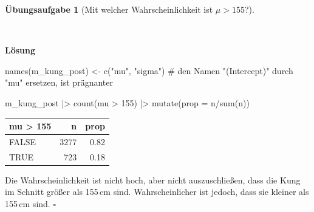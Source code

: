 \documentclass[
  ngerman,
  letterpaper,
  twoside,
  open=any]{scrbook}
\newenvironment{Shaded}{\begin{snugshade}}{\end{snugshade}}
\newcommand{\AttributeTok}[1]{\textcolor[rgb]{0.40,0.45,0.13}{#1}}
\newcommand{\CommentTok}[1]{\textcolor[rgb]{0.37,0.37,0.37}{#1}}
\newcommand{\DecValTok}[1]{\textcolor[rgb]{0.68,0.00,0.00}{#1}}
\newcommand{\FunctionTok}[1]{\textcolor[rgb]{0.28,0.35,0.67}{#1}}
\newcommand{\NormalTok}[1]{\textcolor[rgb]{0.00,0.23,0.31}{#1}}
\newcommand{\OtherTok}[1]{\textcolor[rgb]{0.00,0.23,0.31}{#1}}
\newcommand{\SpecialCharTok}[1]{\textcolor[rgb]{0.37,0.37,0.37}{#1}}
\newcommand{\StringTok}[1]{\textcolor[rgb]{0.13,0.47,0.30}{#1}}
\newcounter{none} %
\theoremstyle{definition}
\theoremstyle{plain}
\theoremstyle{definition}
\newtheorem{exercise}{Übungsaufgabe}[chapter]
\theoremstyle{definition}
\theoremstyle{definition}
\theoremstyle{definition}
\newtheorem{exercise}{Übungsaufgabe}[chapter]
\theoremstyle{remark}
\begin{document}
\begin{exercise}[Mit welcher Wahrscheinlichkeit ist
\(\mu>155\)?]\protect\hypertarget{exr-kung1}{}\label{exr-kung1}

~

\begin{tcolorbox}[enhanced jigsaw, arc=.35mm, bottomrule=.15mm, breakable, colback=white, colframe=quarto-callout-tip-color-frame, left=2mm, leftrule=.75mm, opacityback=0, rightrule=.15mm, toprule=.15mm]

\vspace{-3mm}\textbf{Lösung}\vspace{3mm}

\begin{Shaded}
\begin{Highlighting}[]

\FunctionTok{names}\NormalTok{(m\_kung\_post) }\OtherTok{\textless{}{-}} 
  \FunctionTok{c}\NormalTok{(}\StringTok{"mu"}\NormalTok{, }\StringTok{"sigma"}\NormalTok{)  }\CommentTok{\# den Namen "(Intercept)" durch "mu" ersetzen, ist prägnanter}

\NormalTok{m\_kung\_post }\SpecialCharTok{|\textgreater{}} 
  \FunctionTok{count}\NormalTok{(mu }\SpecialCharTok{\textgreater{}} \DecValTok{155}\NormalTok{) }\SpecialCharTok{|\textgreater{}} 
  \FunctionTok{mutate}\NormalTok{(}\AttributeTok{prop =}\NormalTok{ n}\SpecialCharTok{/}\FunctionTok{sum}\NormalTok{(n))}
\end{Highlighting}
\end{Shaded}

{\def\LTcaptype{none} %
\begin{longtable}[]{@{}lrr@{}}
\toprule\noalign{}
mu \textgreater{} 155 & n & prop \\
\midrule\noalign{}
\endhead
\bottomrule\noalign{}
\endlastfoot
FALSE & 3277 & 0.82 \\
TRUE & 723 & 0.18 \\
\end{longtable}
}

Die Wahrscheinlichkeit ist nicht hoch, aber nicht auszuschließen, dass
die Kung im Schnitt größer als 155\,cm sind. Wahrscheinlicher ist
jedoch, dass sie kleiner als 155\,cm sind. \(\square\)

\end{tcolorbox}

\end{exercise}
\end{document}
